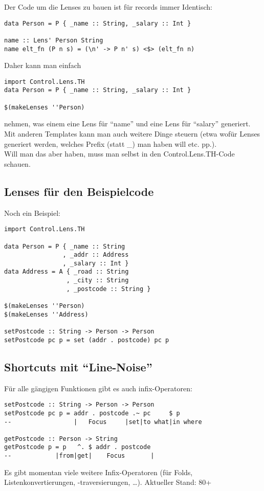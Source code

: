 \documentclass{beamer}
\begin{document}
\begin{frame}[fragile]
Der Code um die Lenses zu bauen ist für records immer Identisch:

\begin{verbatim}
data Person = P { _name :: String, _salary :: Int }

name :: Lens' Person String
name elt_fn (P n s) = (\n' -> P n' s) <$> (elt_fn n)
\end{verbatim}
\pause
Daher kann man einfach

\begin{verbatim}
import Control.Lens.TH
data Person = P { _name :: String, _salary :: Int }

$(makeLenses ''Person)
\end{verbatim}

nehmen, was einem eine Lens für ``name'' und eine Lens für ``salary''
generiert.\\Mit anderen Templates kann man auch weitere Dinge steuern
(etwa wofür Lenses generiert werden, welches Prefix (statt \_) man haben
will etc. pp.).\\Will man das aber haben, muss man selbst in den
Control.Lens.TH-Code schauen.
\end{frame}

\subsection{Lenses für den Beispielcode}
\begin{frame}[fragile]
Noch ein Beispiel:
\begin{verbatim}
import Control.Lens.TH

data Person = P { _name :: String
                , _addr :: Address
                , _salary :: Int }
data Address = A { _road :: String
                 , _city :: String
                 , _postcode :: String }

$(makeLenses ''Person)
$(makeLenses ''Address)

setPostcode :: String -> Person -> Person
setPostcode pc p = set (addr . postcode) pc p
\end{verbatim}
\end{frame}

\subsection{Shortcuts mit ``Line-Noise''}
\begin{frame}[fragile]
Für alle gängigen Funktionen gibt es auch infix-Operatoren:
\begin{verbatim}
setPostcode :: String -> Person -> Person
setPostcode pc p = addr . postcode .~ pc     $ p
--                 |   Focus     |set|to what|in where

getPostcode :: Person -> String
getPostcode p = p   ^. $ addr . postcode
--            |from|get|    Focus       |
\end{verbatim}

Es gibt momentan viele weitere Infix-Operatoren (für Folds,
Listenkonvertierungen, -traversierungen, \ldots{}). Aktueller Stand: 80+
\end{frame}
\end{document}
